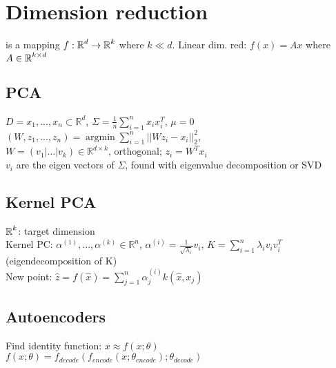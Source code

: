 \section*{Dimension reduction}
is a mapping $f:\operatorname*{\mathbb{R}}^d\rightarrow\operatorname*{\mathbb{R}}^k$ where $k\ll d$. Linear dim. red: $f(x) = Ax$ where $A\in \operatorname*{\mathbb{R}}^{k \times d}$

\subsection*{PCA}
$D={x_1,...,x_n} \subset \mathbb{R}^d$,
$\Sigma = \frac{1}{n}\sum_{i=1}^n x_i x_i^T$, $\mu = 0$\\
$(W,z_1,...,z_n) = \operatorname{argmin} \sum_{i=1}^n||W z_i - x_i||_2^2$,\\
$W = (v_1|...|v_k) \in \mathbb{R}^{d \times k}$, orthogonal; $z_i = W^T x_i$ \\ 
$v_i$ are the eigen vectors of $\Sigma$, found with eigenvalue decomposition or SVD

\subsection*{Kernel PCA}
$\operatorname*{\mathbb{R}}^k$: target dimension\\
Kernel PC: $\alpha^{(1)},...,\alpha^{(k)}\in \mathbb{R}^n$, $\alpha^{(i)} = \frac{1}{\sqrt{\lambda_i}}v_i$, $K = \sum_{i=1}^n \lambda_i v_i v_i^T$ (eigendecomposition of K)\\
New point: $\hat{z} = f(\hat{x}) = \sum_{j=1}^n\alpha_j^{(i)}k(\hat{x},x_j)$

\subsection*{Autoencoders}
Find identity function: $x \approx f(x;\theta)$\\
$f(x;\theta) = f_{decode}(f_{encode}(x;\theta_{encode});\theta_{decode})$